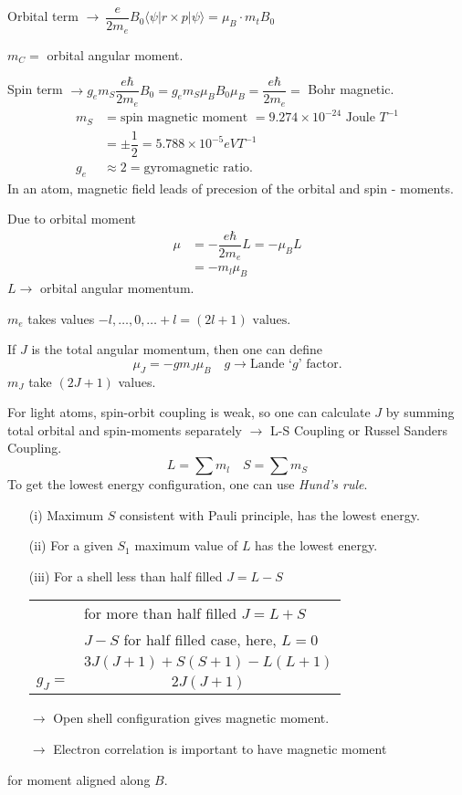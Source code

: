 Orbital term $\to \ \dfrac{e}{2m_{e}}B_{0}\langle \psi |r\times p|\psi\rangle =\mu_{B}\cdot m_{t}B_{0}$

$m_{C}=$ orbital angular moment.

Spin term $\to g_{e}m_{S}\dfrac{e\hbar}{2m_{e}}B_{0}=g_{e}m_{S}\mu_{B}B_{0}\mu_{B}=\dfrac{e\hbar}{2m_{e}}=$ Bohr magnetic.
\begin{align*}
m_{S} &= \text{spin magnetic moment }=9.274\times 10^{-24}\text{ Joule } T^{-1}\\
&= \pm \dfrac{1}{2}=5.788\times 10^{-5}eVT^{-1}\\
g_{e} &\approx 2 = \text{gyromagnetic ratio.}
\end{align*}
In an atom, magnetic field leads of precesion of the orbital and spin - moments.

Due to orbital moment
\begin{align*}
\mu &= -\dfrac{e\hbar}{2m_{e}}L=-\mu_{B}L\\
&= -m_{l}\mu_{B}
\end{align*}
$L\to$ orbital angular momentum.

$m_{e}$ takes values $-l,\ldots,0,\ldots+l=(2l+1)\text{ values}$.

If $J$ is the total angular momentum, then one can define 
$$
\mu_{J}=-gm_{J}\mu_{B}\quad g\to \text{Lande `$g$' factor.}
$$
$m_{J}$ take $(2J+1)$ values.

For light atoms, spin-orbit coupling is weak, so one can calculate $J$ by summing total orbital and spin-moments separately $\to$ L-S Coupling or Russel Sanders Coupling.
$$
L=\sum m_{l}\quad S=\sum m_{S}
$$
To get the lowest energy configuration, one can use {\em Hund's rule}.
\begin{itemize}
\item[(i)] Maximum $S$ consistent with Pauli principle, has the lowest energy.

\item[(ii)] For a given $S_{1}$ maximum value of $L$ has the lowest energy.

\item[(iii)] For a shell less than half filled $J=L-S$
\begin{center}
\begin{tabular}{rl}
 & for more than half filled $J=L+S$\\
 & $J-S$ for half filled case, here, $L=0$\\
 & $3J(J+1)+S(S+1)-L(L+1)$\\
\cline{2-2}
$g_{J}=$ & \multicolumn{1}{c}{$2J(J+1)$}
\end{tabular}
\end{center}
\end{itemize}
\begin{itemize}
\item[$\to$] Open shell configuration gives magnetic moment.

\item[$\to$] Electron correlation is important to have magnetic moment
\end{itemize}
for moment aligned along $B$.

